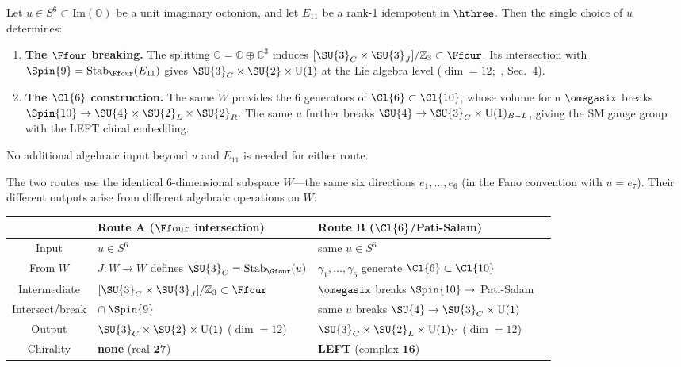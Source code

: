 \begin{theorem}\label{thm:single-input}
Let $u\in S^6\subset\mathrm{Im}(\mathbb{O})$ be a unit imaginary
octonion, and let $E_{11}$ be a rank-1 idempotent in $\hthree$.
Then the single choice of $u$ determines:
\begin{enumerate}
  \item[\textup{(i)}] \textbf{The $\Ffour$ breaking.}\enspace
    The splitting $\mathbb{O} = \mathbb{C}\oplus\mathbb{C}^3$
    induces $[\SU{3}_C\times\SU{3}_J]/\mathbb{Z}_3\subset\Ffour$.
    Its intersection with $\Spin{9} = \mathrm{Stab}_{\Ffour}(E_{11})$
    gives $\SU{3}_C\times\SU{2}\times\mathrm{U}(1)$
    at the Lie algebra level
    \textup{($\dim = 12$;~\cite{TodorovDrenska2018}, Sec.~4)}.
  \item[\textup{(ii)}] \textbf{The $\Cl{6}$ construction.}\enspace
    The same $W$ provides the 6 generators of
    $\Cl{6}\subset\Cl{10}$, whose volume form $\omegasix$ breaks
    $\Spin{10}\to\SU{4}\times\SU{2}_L\times\SU{2}_R$.
    The same $u$ further breaks
    $\SU{4}\to\SU{3}_C\times\mathrm{U}(1)_{B-L}$,
    giving the SM gauge group with the LEFT chiral embedding.
\end{enumerate}
No additional algebraic input beyond $u$ and $E_{11}$ is needed
for either route.
\end{theorem}

The two routes use the identical 6-dimensional subspace $W$---the
same six directions $e_1,\ldots,e_6$ (in the Fano convention with
$u=e_7$).  Their different outputs arise from different algebraic
operations on $W$:

\begin{center}
\small
\renewcommand{\arraystretch}{1.2}
\begin{tabular}{@{}clll@{}}
  \toprule
  & \textbf{Route A} ($\Ffour$ intersection) & \textbf{Route B} ($\Cl{6}$/Pati-Salam) \\
  \midrule
  Input & $u\in S^6$ & same $u\in S^6$ \\
  From $W$ & $J\colon W\to W$ defines $\SU{3}_C = \mathrm{Stab}_{\Gfour}(u)$
    & $\gamma_1,\ldots,\gamma_6$ generate $\Cl{6}\subset\Cl{10}$ \\
  Intermediate & $[\SU{3}_C\times\SU{3}_J]/\mathbb{Z}_3\subset\Ffour$
    & $\omegasix$ breaks $\Spin{10}\to$ Pati-Salam \\
  Intersect/break & $\cap\;\Spin{9}$
    & same $u$ breaks $\SU{4}\to\SU{3}_C\times\mathrm{U}(1)$ \\
  Output & $\SU{3}_C\times\SU{2}\times\mathrm{U}(1)$ ($\dim = 12$)
    & $\SU{3}_C\times\SU{2}_L\times\mathrm{U}(1)_Y$ ($\dim = 12$) \\
  Chirality & \textbf{none} (real $\mathbf{27}$)
    & \textbf{LEFT} (complex $\mathbf{16}$) \\
  \bottomrule
\end{tabular}
\end{center}

